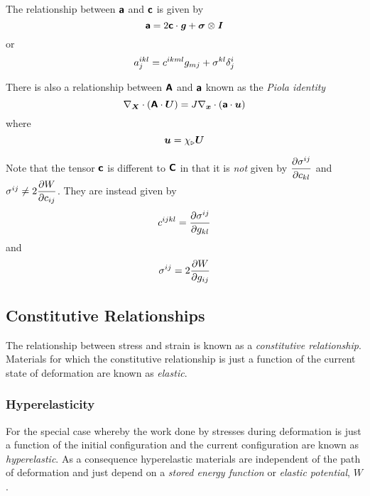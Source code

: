 The relationship between $\boldsymbol{\mathsf{a}}$ and $\boldsymbol{\mathsf{c}}$ is given by
\begin{equation}
  \boldsymbol{\mathsf{a}}=2 \boldsymbol{\mathsf{c}}  \cdot  \boldsymbol{\mathit{g}} + \boldsymbol{\mathit{\sigma}} \otimes \boldsymbol{\mathit{I}} 
\end{equation}
or
\begin{equation}
  a^{ikl}_{j}=c^{ikml}g_{mj}+\sigma^{kl} \delta^{i}_{j} 
\end{equation}

There is also a relationship between $\boldsymbol{\mathsf{A}}$ and $\boldsymbol{\mathsf{a}}$
known as the \emph{Piola identity} \ie
\begin{equation}
  \divergence{\vectr{X}}{\pbrac{\dotprod{\tensorfour{A}}{\vectr{U}}}}=
  J\divergence{\vectr{x}}{\pbrac{\dotprod{\tensorfour{a}}{\vectr{u}}}}
\end{equation}
where
\begin{equation}
   \boldsymbol{u} = \chi_{\triangleright} \boldsymbol{U}  
\end{equation}

Note that the tensor $\boldsymbol{\mathsf{c}}$ is different to $\boldsymbol{\mathsf{C}}$ in that
it is \emph{not} given by $ \dfrac{\partial \sigma^{ij}}{\partial c_{kl}} $ and $\sigma^{ij}\neq
2 \dfrac{\partial W}{\partial c_{ij}} $. They are instead given by
\begin{equation}
  c^{ijkl}= \dfrac{\partial \sigma^{ij}}{\partial g_{kl}} 
\end{equation}
and
\begin{equation}
  \sigma^{ij}=2 \dfrac{\partial W}{\partial g_{ij}} 
\end{equation}

\subsection{Constitutive Relationships}

The relationship between stress and strain is known as a \emph{constitutive
  relationship}. Materials for which the constitutive relationship is just a
function of the current state of deformation are known as \emph{elastic}.

\subsubsection{Hyperelasticity}

For the special case whereby the work done by stresses during deformation is
just a function of the initial configuration and the current configuration are
known as \emph{hyperelastic}. As a consequence hyperelastic materials are
independent of the path of deformation and just depend on a \emph{stored
  energy function} or \emph{elastic potential}, $W$.

